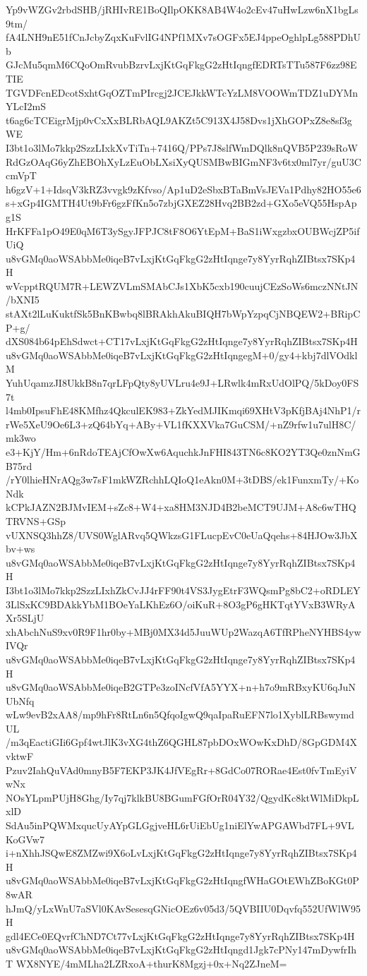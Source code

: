 Yp9vWZGv2rbdSHB/jRHIvRE1BoQIlpOKK8AB4W4o2cEv47uHwLzw6nX1bgLs9tm/
fA4LNH9nE51fCnJcbyZqxKuFvlIG4NPf1MXv7sOGFx5EJ4ppeOghlpLg588PDhUb
GJcMu5qmM6CQoOmRvubBzrvLxjKtGqFkgG2zHtIqngfEDRTsTTu587F6zz98ETIE
TGVDFcnEDcotSxhtGqOZTmPIrcgj2JCEJkkWTcYzLM8VOOWmTDZ1uDYMnYLcI2mS
t6ag6cTCEigrMjp0vCxXxBLRbAQL9AKZt5C913X4J58Dvs1jXhGOPxZ8e8sf3gWE
I3bt1o3lMo7kkp2SzzLIxkXvTiTn+7416Q/PPs7J8slfWmDQlk8nQVB5P239sRoW
RdGzOAqG6yZhEBOhXyLzEuObLXsiXyQUSMBwBIGmNF3v6tx0ml7yr/guU3CcmVpT
h6gzV+1+IdsqV3kRZ3vvgk9zKfvso/Ap1uD2eSbxBTaBmVsJEVa1Pdhy82HO55e6
s+xGp4IGMTH4Ut9bFr6gzFfKn5o7zbjGXEZ28Hvq2BB2zd+GXo5eVQ55HspApg1S
HrKFFa1pO49E0qM6T3ySgyJFPJC8tF8O6YtEpM+BaS1iWxgzbxOUBWcjZP5ifUiQ
u8vGMq0aoWSAbbMe0iqeB7vLxjKtGqFkgG2zHtIqnge7y8YyrRqhZIBtsx7SKp4H
wVcpptRQUM7R+LEWZVLmSMAbCJs1XbK5cxb190cuujCEzSoWs6mczNNtJN/bXNI5
stAXt2lLuKuktfSk5BnKBwbq8lBRAkhAkuBIQH7bWpYzpqCjNBQEW2+BRipCP+g/
dXS084b64pEhSdwct+CT17vLxjKtGqFkgG2zHtIqnge7y8YyrRqhZIBtsx7SKp4H
u8vGMq0aoWSAbbMe0iqeB7vLxjKtGqFkgG2zHtIqngegM+0/gy4+kbj7dlVOdklM
YuhUqamzJI8UkkB8n7qrLFpQty8yUVLru4e9J+LRwlk4mRxUdOlPQ/5kDoy0FS7t
l4mb0IpsuFhE48KMfhz4QkculEK983+ZkYedMJIKmqi69XHtV3pKfjBAj4NhP1/r
rWe5XeU9Oe6L3+zQ64bYq+ABy+VL1fKXXVka7GuCSM/+nZ9rfw1u7ulH8C/mk3wo
e3+KjY/Hm+6nRdoTEAjCfOwXw6AquchkJnFHI843TN6c8KO2YT3Qe0znNmGB75rd
/rY0lhieHNrAQg3w7sF1mkWZRchhLQIoQ1eAkn0M+3tDBS/ek1FunxmTy/+KoNdk
kCPkJAZN2BJMvIEM+sZc8+W4+xa8HM3NJD4B2beMCT9UJM+A8c6wTHQTRVNS+GSp
vUXNSQ3hhZ8/UVS0WglARvq5QWkzsG1FLucpEvC0eUaQqehs+84HJOw3JbXbv+ws
u8vGMq0aoWSAbbMe0iqeB7vLxjKtGqFkgG2zHtIqnge7y8YyrRqhZIBtsx7SKp4H
I3bt1o3lMo7kkp2SzzLIxhZkCvJJ4rFF90t4VS3JygEtrF3WQsmPg8bC2+oRDLEY
3LlSxKC9BDAkkYbM1BOeYaLKhEz6O/oiKuR+8O3gP6gHKTqtYVxB3WRyAXr5SLjU
xhAbchNuS9xv0R9F1hr0by+MBj0MX34d5JuuWUp2WazqA6TfRPheNYHBS4ywIVQr
u8vGMq0aoWSAbbMe0iqeB7vLxjKtGqFkgG2zHtIqnge7y8YyrRqhZIBtsx7SKp4H
u8vGMq0aoWSAbbMe0iqeB2GTPe3zoINcfVfA5YYX+n+h7o9mRBxyKU6qJuNUbNfq
wLw9evB2xAA8/mp9hFr8RtLn6n5QfqoIgwQ9qaIpaRuEFN7lo1XyblLRBswymdUL
/m3qEactiGIi6Gpf4wtJlK3vXG4thZ6QGHL87pbDOxWOwKxDhD/8GpGDM4XvktwF
Pzuv2IahQuVAd0mnyB5F7EKP3JK4JfVEgRr+8GdCo07RORae4Est0fvTmEyiVwNx
NOsYLpmPUjH8Ghg/Iy7qj7klkBU8BGumFGfOrR04Y32/QgydKc8ktWlMiDkpLxlD
SdAu5inPQWMxqucUyAYpGLGgjveHL6rUiEbUg1niElYwAPGAWbd7FL+9VLKoGVw7
i+nXhhJSQwE8ZMZwi9X6oLvLxjKtGqFkgG2zHtIqnge7y8YyrRqhZIBtsx7SKp4H
u8vGMq0aoWSAbbMe0iqeB7vLxjKtGqFkgG2zHtIqngfWHaGOtEWhZBoKGt0P8wAR
hJmQ/yLxWnU7aSVl0KAvSesesqGNicOEz6v05d3/5QVBIIU0Dqvfq552UfWlW95H
gdl4ECe0EQvrfChND7Ct77vLxjKtGqFkgG2zHtIqnge7y8YyrRqhZIBtsx7SKp4H
u8vGMq0aoWSAbbMe0iqeB7vLxjKtGqFkgG2zHtIqngd1Jgk7cPNy147mDywfrIhT
WX8NYE/4mMLha2LZRxoA+thurK8Mgzj+0x+Nq2ZJneM=
